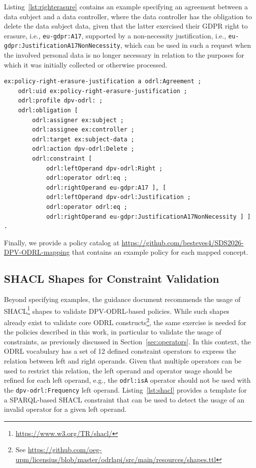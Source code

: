 Listing~\ref{lst:righterasure} contains an
example specifying an agreement between
a data subject and
a data controller,
where the data controller has the obligation
to delete the data subject data,
given that the latter exercised their
GDPR right to erasure, i.e., \texttt{eu-gdpr:A17},
supported by a non-necessity justification,
i.e., \texttt{eu-gdpr:JustificationA17NonNecessity},
which can be used in such a request
when the involved personal data is no longer necessary
in relation to the purposes for which it was initially collected
or otherwise processed.

\begin{scriptsize}
\begin{lstlisting}[language=turtle, caption=Obligation-based policy for the exercising of a right and related justification., label=lst:righterasure]
ex:policy-right-erasure-justification a odrl:Agreement ;
    odrl:uid ex:policy-right-erasure-justification ;
    odrl:profile dpv-odrl: ;
    odrl:obligation [
        odrl:assigner ex:subject ;
        odrl:assignee ex:controller ;
        odrl:target ex:subject-data ;
        odrl:action dpv-odrl:Delete ;
        odrl:constraint [
            odrl:leftOperand dpv-odrl:Right ;
            odrl:operator odrl:eq ;
            odrl:rightOperand eu-gdpr:A17 ], [
            odrl:leftOperand dpv-odrl:Justification ;
            odrl:operator odrl:eq ;
            odrl:rightOperand eu-gdpr:JustificationA17NonNecessity ] ] .
\end{lstlisting}
\end{scriptsize}

Finally,
we provide a policy catalog at
\url{https://github.com/besteves4/SDS2026-DPV-ODRL-mapping}
that contains an example policy for each mapped concept.

\subsection{SHACL Shapes for Constraint Validation}
\label{sec:shacl}

Beyond specifying examples,
the guidance document
recommends the usage of SHACL\footnote{
    \url{https://www.w3.org/TR/shacl/}
} shapes
to validate DPV-ODRL-based policies.
While such shapes already exist
to validate core ODRL constructs\footnote{See \url{
    https://github.com/oeg-upm/licensius/blob/master/odrlapi/src/main/resources/shapes.ttl}},
the same exercise is needed for
the policies described in this work,
in particular to validate the usage of constraints,
as previously discussed in Section~\ref{sec:operators}.
In this context,
the ODRL vocabulary has a set of 12
defined constraint operators to express
the relation between left and right operands.
Given that multiple operators
can be used to restrict this relation,
the left operand and operator usage
should be refined for each left operand,
e.g., the \texttt{odrl:isA} operator
should not be used with the
\texttt{dpv-odrl:Frequency} left operand.
Listing~\ref{lst:shacl}
provides a template 
for a SPARQL-based SHACL constraint
that can be used to
detect the usage of an invalid operator
for a given left operand.

